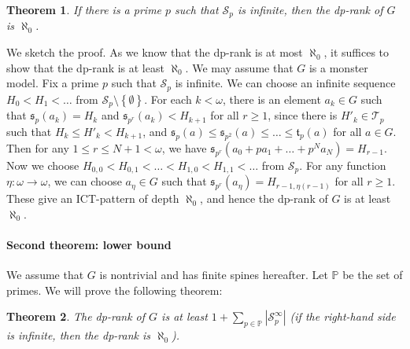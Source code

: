 \documentclass{article}
\theoremstyle{definition}
\theoremstyle{remark}
\theoremstyle{plain}
\newtheorem*{thm*}{Theorem}
\begin{document}
\begin{thm*}
	If there is a prime $p$ such that $\mathcal{S}_p$ is infinite, then the dp-rank of $G$ is $\aleph_0$.
\end{thm*}

We sketch the proof.
As we know that the dp-rank is at most $\aleph_0$, it suffices to show that the dp-rank is at least $\aleph_0$.
We may assume that $G$ is a monster model.
Fix a prime $p$ such that $\mathcal{S}_p$ is infinite.
We can choose an infinite sequence $H_0 < H_1 < \dots$ from $\mathcal{S}_p \setminus \left\{ \emptyset \right\}$.
For each $k < \omega$, there is an element $a_k \in G$ such that $\mathfrak{s}_p(a_k) = H_k$ and $\mathfrak{s}_{p^r}(a_k) < H_{k+1}$ for all $r \geq 1$, since there is $H'_k \in \mathcal{T}_p$ such that $H_k \leq H'_k < H_{k+1}$, and $\mathfrak{s}_p(a) \leq \mathfrak{s}_{p^2}(a) \leq \dots \leq \mathfrak{t}_p(a)$ for all $a \in G$.
Then for any $1 \leq r \leq N + 1 < \omega$, we have $\mathfrak{s}_{p^r}(a_0 + p a_1 + \dots + p^N a_N) = H_{r-1}$.
Now we choose $H_{0,0} < H_{0,1} < \dots < H_{1,0} < H_{1,1} < \dots$ from $\mathcal{S}_p$.
For any function $\eta: \omega \to \omega$, we can choose $a_{\eta} \in G$ such that $\mathfrak{s}_{p^r}(a_{\eta}) = H_{r-1, \eta(r-1)}$ for all $r \geq 1$.
These give an ICT-pattern of depth $\aleph_0$, and hence the dp-rank of $G$ is at least $\aleph_0$.

\paragraph{Second theorem: lower bound}
We assume that $G$ is nontrivial and has finite spines hereafter.
Let $\mathbb{P}$ be the set of primes.
We will prove the following theorem:

\begin{thm*}
	The dp-rank of $G$ is at least $1 + \sum_{p \in \mathbb{P}} \left| \mathcal{S}_p^{\infty} \right|$ (if the right-hand side is infinite, then the dp-rank is $\aleph_0$).
\end{thm*}
\end{document}
